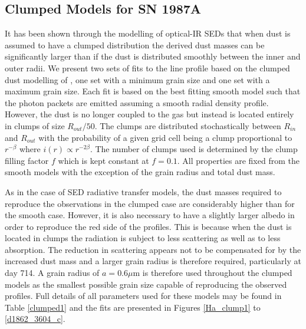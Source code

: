 \documentclass[useAMS,usenatbib,usegraphicx]{mnras}
\begin{document}
\subsection{Clumped Models for SN 1987A}
\label{clumped_models}


It has been shown through the modelling of optical-IR SEDs that when dust 
is assumed to have a clumped distribution the derived dust masses can be 
significantly larger than if the dust is distributed smoothly between the 
inner and outer radii.  We present two sets of fits to the line profile based on 
the clumped dust modelling of \citet{Wesson2015}, one set with a minimum grain size and one set with a maximum grain size.  Each fit is based on the best 
fitting smooth model such that the photon packets are emitted assuming a smooth 
radial density profile.  However, the dust is no longer coupled to the gas 
but instead is located entirely in clumps of size $R_{out}/50$.  The 
clumps are distributed stochastically between $R_{in}$ and $R_{out}$ with 
the probability of a given grid cell being a clump proportional to $r^{- 
\beta }$ where $i(r) \propto r^{-2 \beta}$.  The number of clumps used is 
determined by the clump filling factor $f$ which is kept constant at $f=0.1$.  All 
properties are fixed from the smooth models with the exception of the grain 
radius and total dust mass.

As in the case of SED radiative transfer models, the dust masses required to reproduce the 
observations in the clumped case are considerably higher than for the smooth case.  
However, it is also necessary to have a slightly larger albedo in order to 
reproduce the red side of the profiles.  This is because when 
the dust is located in clumps the radiation is subject to less scattering 
as well as to less absorption.  The reduction in scattering appears not to be 
compensated for by the increased dust mass and a larger grain radius is 
therefore required, particularly at day 714.  A grain radius of $a=0.6\mu$m 
is therefore used throughout the clumped models as the smallest possible 
grain size capable of reproducing the observed profiles. Full details of all 
parameters used for these models may be found in Table \ref{clumped1} and 
the fits are presented in Figures \ref{Ha_clump1} to \ref{d1862_3604_c}.
\end{document}
